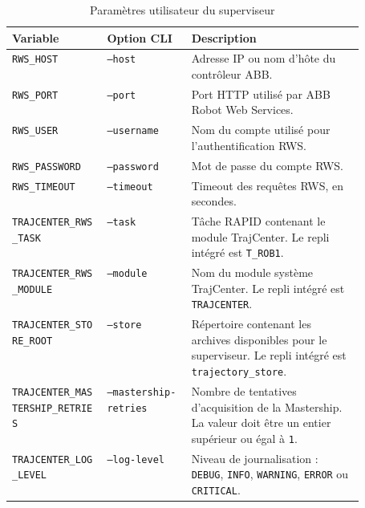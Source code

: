 \documentclass{rapportENSAM}
\begin{document}
\begin{table}[ht]
    \centering
    \small
    \begin{tabularx}{\linewidth}{
        |p{0.27\linewidth}
        |p{0.24\linewidth}
        |X|
    }
        \hline
        \textbf{Variable} &
        \textbf{Option CLI} &
        \textbf{Description} \\
        \hline

        \texttt{RWS\_HOST} &
        \texttt{--host} &
        Adresse IP ou nom d'hôte du contrôleur ABB. \\
        \hline

        \texttt{RWS\_PORT} &
        \texttt{--port} &
        Port HTTP utilisé par ABB Robot Web Services. \\
        \hline

        \texttt{RWS\_USER} &
        \texttt{--username} &
        Nom du compte utilisé pour l'authentification RWS. \\
        \hline

        \texttt{RWS\_PASSWORD} &
        \texttt{--password} &
        Mot de passe du compte RWS. \\
        \hline

        \texttt{RWS\_TIMEOUT} &
        \texttt{--timeout} &
        Timeout des requêtes RWS, en secondes. \\
        \hline

        \texttt{TRAJCENTER\_RWS\_TASK} &
        \texttt{--task} &
        Tâche RAPID contenant le module TrajCenter. Le repli intégré est
        \texttt{T\_ROB1}. \\
        \hline

        \texttt{TRAJCENTER\_RWS\_MODULE} &
        \texttt{--module} &
        Nom du module système TrajCenter. Le repli intégré est
        \texttt{TRAJCENTER}. \\
        \hline

        \texttt{TRAJCENTER\_STORE\_ROOT} &
        \texttt{--store} &
        Répertoire contenant les archives disponibles pour le superviseur.
        Le repli intégré est \texttt{trajectory\_store}. \\
        \hline

        \texttt{TRAJCENTER\_MASTERSHIP\_RETRIES} &
        \texttt{--mastership-retries} &
        Nombre de tentatives d'acquisition de la Mastership. La valeur doit
        être un entier supérieur ou égal à \texttt{1}. \\
        \hline

        \texttt{TRAJCENTER\_LOG\_LEVEL} &
        \texttt{--log-level} &
        Niveau de journalisation : \texttt{DEBUG}, \texttt{INFO},
        \texttt{WARNING}, \texttt{ERROR} ou \texttt{CRITICAL}. \\
        \hline
    \end{tabularx}
    \caption{Paramètres utilisateur du superviseur}
    \label{tab:pc-user-configuration}
\end{table}
\end{document}
